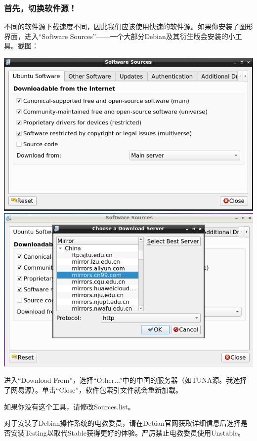 \documentclass{book}
\begin{document}
\subsubsection{首先，切换软件源！}
不同的软件源下载速度不同，因此我们应该使用快速的软件源。如果你安装了图形界面，进入“Software Sources”——一个大部分Debian及其衍生版会安装的小工具。截图：
\begin{center}
	\includegraphics[scale=0.4]{pic/src1}	\includegraphics[scale=0.4]{pic/src2}
\end{center}
进入“Download From”，选择“Other...”中的中国的服务器（如TUNA源。我选择了网易源）。单击“Close”，软件包索引文件就会重新加载。\par
如果你没有这个工具，请修改Sources.list。\par
对于安装了Debian操作系统的电教委员，请在Debian官网获取详细信息后选择是否安装Testing以取代Stable获得更好的体验。严厉禁止电教委员使用Unstable。
\end{document}
